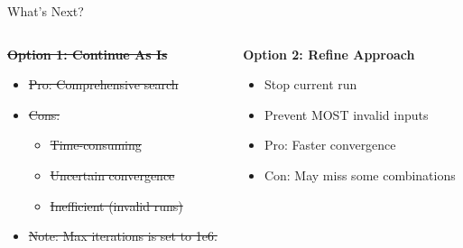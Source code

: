 \begin{frame}{What's Next?}
    \begin{columns}
        \begin{column}{0.5\textwidth}
            \textbf{\sout{Option 1: Continue As Is}}
            \begin{itemize}
                \item \sout{Pro: Comprehensive search}
                \item \sout{Cons:}
                      \begin{itemize}
                          \item \sout{Time-consuming}
                          \item \sout{Uncertain convergence}
                          \item \sout{Inefficient (invalid runs)}
                      \end{itemize}
                \item \sout{Note: Max iterations is set to 1e6.}
            \end{itemize}
        \end{column}
        \begin{column}{0.5\textwidth}
            \textbf{Option 2: Refine Approach}
            \begin{itemize}
                \item Stop current run
                \item Prevent MOST invalid inputs
                \item Pro: Faster convergence
                \item Con: May miss some combinations
            \end{itemize}
        \end{column}
    \end{columns}
\end{frame}
